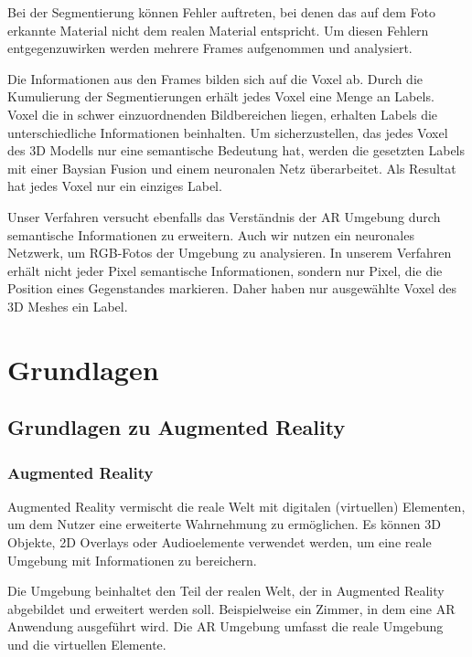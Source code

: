 Bei der Segmentierung können Fehler auftreten, bei denen das auf dem Foto erkannte Material nicht dem realen Material entspricht. Um diesen Fehlern entgegenzuwirken werden mehrere Frames aufgenommen und analysiert. %

Die Informationen aus den Frames bilden sich auf die Voxel ab. Durch die Kumulierung der Segmentierungen erhält jedes Voxel eine Menge an Labels. Voxel die in schwer einzuordnenden Bildbereichen liegen, erhalten Labels die unterschiedliche Informationen beinhalten. Um sicherzustellen, das jedes Voxel des 3D Modells nur eine semantische Bedeutung hat, werden die gesetzten Labels mit einer Baysian Fusion und einem neuronalen Netz überarbeitet. Als Resultat hat jedes Voxel nur ein einziges Label.

Unser Verfahren versucht ebenfalls das Verständnis der AR Umgebung durch semantische Informationen zu erweitern. Auch wir nutzen ein neuronales Netzwerk, um RGB-Fotos der Umgebung zu analysieren.
In unserem Verfahren erhält nicht jeder Pixel semantische Informationen, sondern nur Pixel, die die Position eines Gegenstandes markieren. Daher haben nur ausgewählte Voxel des 3D Meshes ein Label.\citep{contextawaremixedreality}

\newpage
\section{Grundlagen}
\subsection{Grundlagen zu Augmented Reality}
\subsubsection{Augmented Reality}

Augmented Reality vermischt die reale Welt mit digitalen (virtuellen) Elementen, um dem Nutzer eine erweiterte Wahrnehmung zu ermöglichen. Es können 3D Objekte, 2D Overlays oder Audioelemente verwendet werden, um eine reale Umgebung mit Informationen zu bereichern. 

Die Umgebung beinhaltet den Teil der realen Welt, der in Augmented Reality abgebildet und erweitert werden soll. Beispielweise ein Zimmer, in dem eine AR Anwendung ausgeführt wird. Die AR Umgebung umfasst die reale Umgebung und die virtuellen Elemente.

